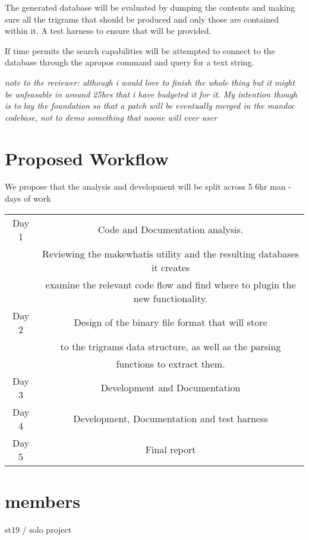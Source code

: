 \documentclass{report}
\begin{document}
The generated database will be evaluated by dumping the contents and making sure all the trigrams that should
be produced and only those are contained within it. A test harness to ensure that will be provided.

If time permits the search capabilities will be attempted to connect to the database through the apropos
command and query for a text string.

{\it note to the reviewer: although i would love to finish the whole thing but it might be unfeasable in 
around 25hrs that i have budgeted it for it. My intention though is to lay the foundation so that a patch
will be eventually merged in the mandoc codebase, not to demo something that noone will ever user}

\section*{Proposed Workflow}
We propose that the analysis and development will be split across 5 6hr man - days of work

\begin{center}
\begin{tabular}{| c | c |}
\hline
Day 1 & Code and Documentation analysis.\\
& Reviewing the makewhatis utility and the resulting databases it creates \\
& examine the relevant code flow and find where to plugin the new functionality.\\
\hline
Day 2 & Design of the binary file format that will store\\
& to the trigrams data structure, as well as the parsing\\
& functions to extract them. \\
\hline
Day 3 & Development and Documentation  \\
\hline
Day 4 & Development, Documentation and test harness \\
\hline
Day 5 & Final report \\
\hline
\end{tabular}
\end{center}

\section*{members}
st19 / solo project 
\end{document}
